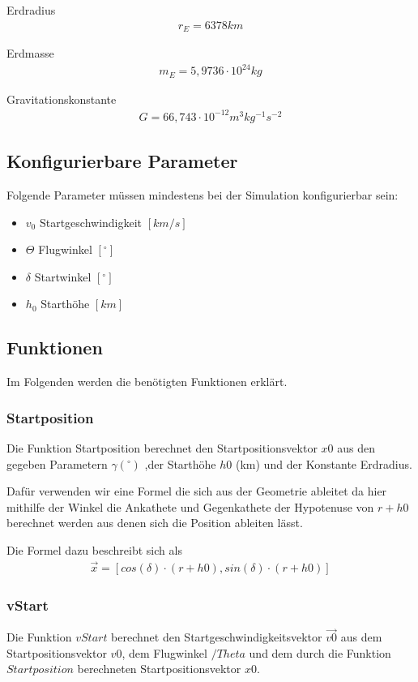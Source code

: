 \documentclass[]{scrartcl}
\begin{document}
Erdradius
\begin{align}
r_{E} = 6378 km
\end{align}

Erdmasse
\begin{align}
m_{E} = 5,9736 \cdot 10^{24} kg
\end{align}

Gravitationskonstante
\begin{align}
G = 66,743 \cdot 10^{-12} m^{3} kg^{-1} s^{-2}
\end{align}

\subsection{Konfigurierbare Parameter}
Folgende Parameter müssen mindestens bei der Simulation konfigurierbar sein:
\begin{itemize}
\item $v_{0}$ Startgeschwindigkeit $[km/s]$
\item $\Theta$ Flugwinkel $[^\circ]$
\item $\delta$ Startwinkel $[^\circ]$
\item $h_{0}$ Starthöhe $[km]$
\end{itemize}

\subsection{Funktionen}
Im Folgenden werden die benötigten Funktionen erklärt.

\subsubsection{Startposition}
Die Funktion Startposition berechnet den Startpositionsvektor $x0$ aus den gegeben Parametern $\gamma (^\circ)$ ,der Starthöhe $h0$ (km) und der Konstante Erdradius.

Dafür verwenden wir eine Formel die sich aus der Geometrie ableitet da hier mithilfe der Winkel die Ankathete und Gegenkathete der Hypotenuse von $r + h0$ berechnet werden aus denen sich die Position ableiten lässt.

Die Formel dazu beschreibt sich als 
\begin{align}
\vec{x} = [cos(\delta) \cdot( r + h0), sin(\delta) \cdot (r + h0)]
\end{align}

\subsubsection{vStart}
Die Funktion $vStart$ berechnet den Startgeschwindigkeitsvektor $\vec{v0}$ aus dem Startpositionsvektor $v0$, dem Flugwinkel $/Theta$ und dem durch die Funktion $Startposition$ berechneten Startpositionsvektor $x0$.
\end{document}
